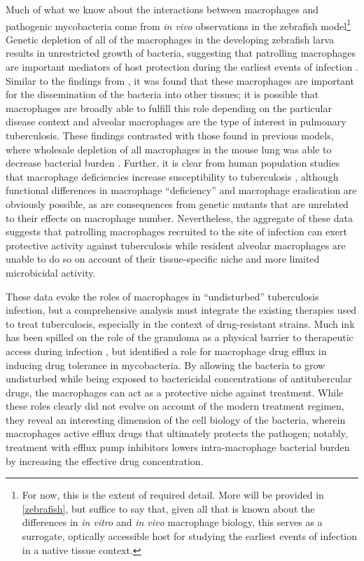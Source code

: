 Much of what we know about the interactions between macrophages and pathogenic mycobacteria come from \textit{in vivo} observations in the zebrafish model\footnote{For now, this is the extent of required detail. More will be provided in \autoref{zebrafish}, but suffice to say that, given all that is known about the differences in \textit{in vitro} and \textit{in vivo} macrophage biology, this serves as a surrogate, optically accessible host for studying the earliest events of infection in a native tissue context.} Genetic depletion of all of the macrophages in the developing zebrafish larva results in unrestricted growth of bacteria, suggesting that patrolling macrophages are important mediators of host protection during the earliest events of infection \citep{Clay2007}. Similar to the findings from \citeauthor{Cohen2018}, it was found that these macrophages are important for the dissemination of the bacteria into other tissues; it is possible that macrophages are broadly able to fulfill this role depending on the particular disease context and alveolar macrophages are the type of interest in pulmonary tuberculosis. These findings contrasted with those found in previous models, where wholesale depletion of all macrophages in the mouse lung was able to decrease bacterial burden \citep{Leemans2005}. Further, it is clear from human population studies that macrophage deficiencies increase susceptibility to tuberculosis \citep{Hambleton2011}, although functional differences in macrophage ``deficiency'' and macrophage eradication are obviously possible, as are consequences from genetic mutants that are unrelated to their effects on macrophage number. Nevertheless, the aggregate of these data suggests that patrolling macrophages recruited to the site of infection can exert protective activity against tuberculosis while resident alveolar macrophages are unable to do so on account of their tissue\hyp{}specific niche and more limited microbicidal activity.

These data evoke the roles of macrophages in ``undisturbed'' tuberculosis infection, but a comprehensive analysis must integrate the existing therapies used to treat tuberculosis, especially in the context of drug\hyp{}resistant strains. Much ink has been spilled on the role of the granuloma as a physical barrier to therapeutic access during infection \citep{Ekins2014, Cronan2022, Driver2012, Cicchese2020}, but \citet{Adams2011} identified a role for macrophage drug efflux in inducing drug tolerance in mycobacteria. By allowing the bacteria to grow undisturbed while being exposed to bactericidal concentrations of antitubercular drugs, the macrophages can act as a protective niche against treatment. While these roles clearly did not evolve on account of the modern treatment regimen, they reveal an interesting dimension of the cell biology of the bacteria, wherein macrophages active efflux drugs that ultimately protects the pathogen; notably, treatment with efflux pump inhibitors lowers intra\hyp{}macrophage bacterial burden by increasing the effective drug concentration.


